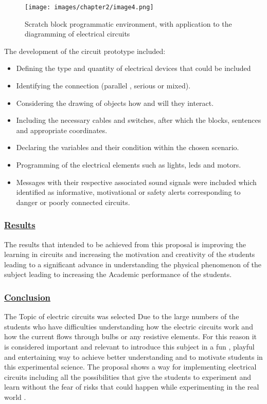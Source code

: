 \documentclass[../main.tex]{subfiles}
\begin{document}
\begin{figure}[!ht]
\centering
\texttt{[image: images/chapter2/image4.png]}
\caption{Scratch block programmatic environment, with application to the diagramming of electrical circuits}
\label{fig:Scratch block programmatic environment, with application to the diagramming of electrical circuits}
\end{figure}

The development of the circuit prototype included:
\begin{itemize}
    \item Defining the type and quantity of electrical devices that could be included
    \item Identifying  the connection  (parallel , serious or mixed).
    \item Considering the drawing of objects 
     how and will they interact.
     \item Including the necessary cables and switches, after which the blocks, sentences and appropriate coordinates.
     \item Declaring the variables and their condition within the chosen scenario.
     \item Programming of the electrical elements such as lights, \acrshort{led}s and motors.
     \item Messages with their respective associated sound signals were included which identified as informative, motivational or safety alerts corresponding to danger or poorly connected circuits.
\end{itemize}

 \subsubsection*{\underline{Results}}

 The results that intended to be achieved from this proposal is improving the learning in circuits and increasing the motivation and creativity of the students leading to a signiﬁcant advance in understanding the physical phenomenon of the subject leading to increasing the Academic performance of the students.

\subsubsection*{\underline{Conclusion}}

The Topic of electric circuits was selected Due to the large numbers of the students who have difficulties understanding how the electric circuits work and how the current flows through bulbs or any resistive elements. For this reason it is considered important and relevant to introduce this subject  in a fun , playful and entertaining way to achieve better understanding and to motivate students in this experimental science. The proposal shows a way for implementing electrical circuits including all the possibilities that give the students  to experiment and learn without the fear of risks that could happen while experimenting in the real world \cite{27}.
\newpage
\end{document}
